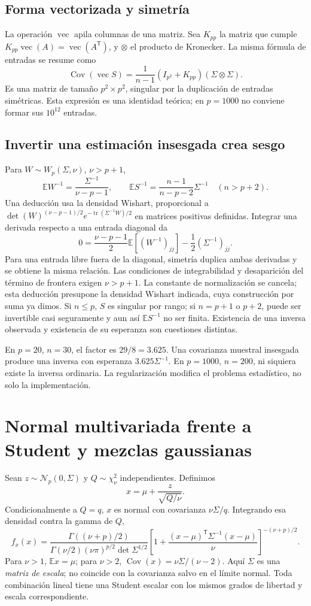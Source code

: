 \documentclass[11pt,a4paper]{article}
\newcommand{\E}{\mathbb E}
\newcommand{\T}{^{\mathsf T}}
\DeclareMathOperator{\Cov}{Cov}
\DeclareMathOperator{\tr}{tr}
\theoremstyle{definition}
\begin{document}
\subsection{Forma vectorizada y simetría}
La operación $\operatorname{vec}$ apila columnas de una matriz. Sea $K_{pp}$ la matriz que cumple $K_{pp}\operatorname{vec}(A)=\operatorname{vec}(A\T)$, y $\otimes$ el producto de Kronecker. La misma fórmula de entradas se resume como
\[
\Cov(\operatorname{vec}S)=\frac1{n-1}(I_{p^2}+K_{pp})(\Sigma\otimes\Sigma).
\]
Es una matriz de tamaño $p^2\times p^2$, singular por la duplicación de entradas simétricas. Esta expresión es una identidad teórica; en $p=1000$ no conviene formar sus $10^{12}$ entradas.
\subsection{Invertir una estimación insesgada crea sesgo}
Para $W\sim W_p(\Sigma,\nu)$, $\nu>p+1$,
\[
\E W^{-1}=\frac{\Sigma^{-1}}{\nu-p-1},\qquad
\boxed{\E S^{-1}=\frac{n-1}{n-p-2}\Sigma^{-1}\quad(n>p+2)}.
\]
Una deducción usa la densidad Wishart, proporcional a $\det(W)^{(\nu-p-1)/2}e^{-\tr(\Sigma^{-1}W)/2}$ en matrices positivas definidas. Integrar una derivada respecto a una entrada diagonal da
\[
0=\frac{\nu-p-1}2\E[(W^{-1})_{jj}]-\frac12(\Sigma^{-1})_{jj}.
\]
Para una entrada libre fuera de la diagonal, simetría duplica ambas derivadas y se obtiene la misma relación. Las condiciones de integrabilidad y desaparición del término de frontera exigen $\nu>p+1$. La constante de normalización se cancela; esta deducción presupone la densidad Wishart indicada, cuya construcción por suma ya dimos.
Si $n\le p$, $S$ es singular por rango; si $n=p+1$ o $p+2$, puede ser invertible casi seguramente y aun así $\E S^{-1}$ no ser finita. Existencia de una inversa observada y existencia de su esperanza son cuestiones distintas.
\begin{ejemplo}
En $p=20$, $n=30$, el factor es $29/8=3.625$. Una covarianza muestral insesgada produce una inversa con esperanza $3.625\Sigma^{-1}$. En $p=1000$, $n=200$, ni siquiera existe la inversa ordinaria. La regularización modifica el problema estadístico, no solo la implementación.
\end{ejemplo}

\section{Normal multivariada frente a Student y mezclas gaussianas}
Sean $z\sim\mathcal N_p(0,\Sigma)$ y $Q\sim\chi^2_\nu$ independientes. Definimos
\[
x=\mu+\frac{z}{\sqrt{Q/\nu}}.
\]
Condicionalmente a $Q=q$, $x$ es normal con covarianza $\nu\Sigma/q$. Integrando esa densidad contra la gamma de $Q$,
\[
f_x(x)=\frac{\Gamma((\nu+p)/2)}{\Gamma(\nu/2)(\nu\pi)^{p/2}\det\Sigma^{1/2}}
\left[1+\frac{(x-\mu)\T\Sigma^{-1}(x-\mu)}\nu\right]^{-(\nu+p)/2}.
\]
Para $\nu>1$, $\E x=\mu$; para $\nu>2$, $\Cov(x)=\nu\Sigma/(\nu-2)$. Aquí $\Sigma$ es una \emph{matriz de escala}; no coincide con la covarianza salvo en el límite normal. Toda combinación lineal tiene una Student escalar con los mismos grados de libertad y escala correspondiente.
\end{document}
